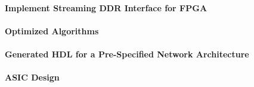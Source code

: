 \paragraph{Implement Streaming DDR Interface for FPGA}

\paragraph{Optimized Algorithms}

\paragraph{Generated HDL for a Pre-Specified Network Architecture}

\paragraph{ASIC Design}
